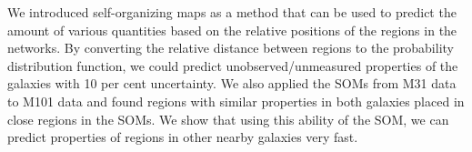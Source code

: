 We introduced self-organizing maps as a method that can be used to predict the amount of various quantities based on the relative positions of the regions in the networks.
By converting the relative distance between regions to the probability distribution function, we could predict unobserved/unmeasured properties of the galaxies with 10 per cent uncertainty.
We also applied the SOMs from M31 data to M101 data and found regions with similar properties in both galaxies placed in close regions in the SOMs.
We show that using this ability of the SOM, we can predict properties of regions in other nearby galaxies very fast.

 


